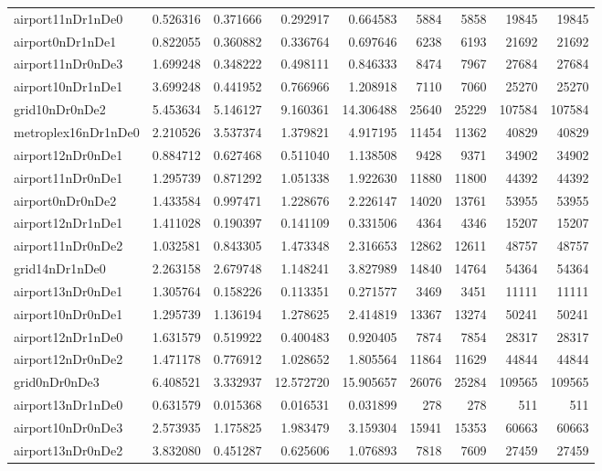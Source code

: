 \begin{longtable}{|l|r|r|r|r|r|r|r|r|}
airport11nDr1nDe0 & 0.526316 & 0.371666 & 0.292917 & 0.664583 & 5884 & 5858 & 19845 & 19845 \\
airport0nDr1nDe1 & 0.822055 & 0.360882 & 0.336764 & 0.697646 & 6238 & 6193 & 21692 & 21692 \\
airport11nDr0nDe3 & 1.699248 & 0.348222 & 0.498111 & 0.846333 & 8474 & 7967 & 27684 & 27684 \\
airport10nDr1nDe1 & 3.699248 & 0.441952 & 0.766966 & 1.208918 & 7110 & 7060 & 25270 & 25270 \\
grid10nDr0nDe2 & 5.453634 & 5.146127 & 9.160361 & 14.306488 & 25640 & 25229 & 107584 & 107584 \\
metroplex16nDr1nDe0 & 2.210526 & 3.537374 & 1.379821 & 4.917195 & 11454 & 11362 & 40829 & 40829 \\
airport12nDr0nDe1 & 0.884712 & 0.627468 & 0.511040 & 1.138508 & 9428 & 9371 & 34902 & 34902 \\
airport11nDr0nDe1 & 1.295739 & 0.871292 & 1.051338 & 1.922630 & 11880 & 11800 & 44392 & 44392 \\
airport0nDr0nDe2 & 1.433584 & 0.997471 & 1.228676 & 2.226147 & 14020 & 13761 & 53955 & 53955 \\
airport12nDr1nDe1 & 1.411028 & 0.190397 & 0.141109 & 0.331506 & 4364 & 4346 & 15207 & 15207 \\
airport11nDr0nDe2 & 1.032581 & 0.843305 & 1.473348 & 2.316653 & 12862 & 12611 & 48757 & 48757 \\
grid14nDr1nDe0 & 2.263158 & 2.679748 & 1.148241 & 3.827989 & 14840 & 14764 & 54364 & 54364 \\
airport13nDr0nDe1 & 1.305764 & 0.158226 & 0.113351 & 0.271577 & 3469 & 3451 & 11111 & 11111 \\
airport10nDr0nDe1 & 1.295739 & 1.136194 & 1.278625 & 2.414819 & 13367 & 13274 & 50241 & 50241 \\
airport12nDr1nDe0 & 1.631579 & 0.519922 & 0.400483 & 0.920405 & 7874 & 7854 & 28317 & 28317 \\
airport12nDr0nDe2 & 1.471178 & 0.776912 & 1.028652 & 1.805564 & 11864 & 11629 & 44844 & 44844 \\
grid0nDr0nDe3 & 6.408521 & 3.332937 & 12.572720 & 15.905657 & 26076 & 25284 & 109565 & 109565 \\
airport13nDr1nDe0 & 0.631579 & 0.015368 & 0.016531 & 0.031899 & 278 & 278 & 511 & 511 \\
airport10nDr0nDe3 & 2.573935 & 1.175825 & 1.983479 & 3.159304 & 15941 & 15353 & 60663 & 60663 \\
airport13nDr0nDe2 & 3.832080 & 0.451287 & 0.625606 & 1.076893 & 7818 & 7609 & 27459 & 27459 \\

\end{longtable}
